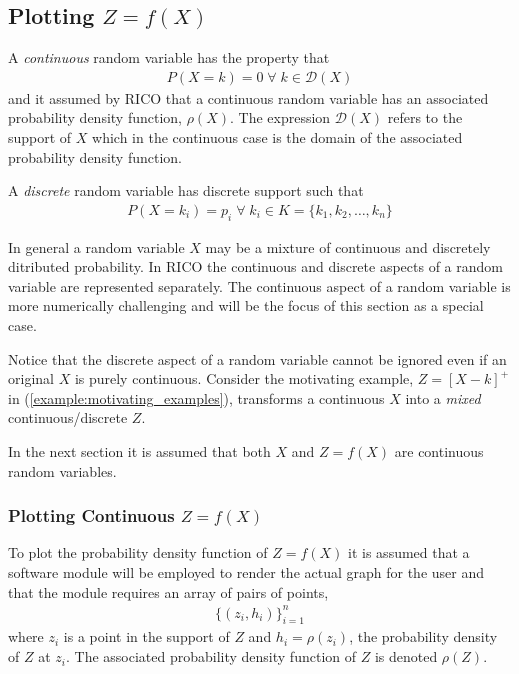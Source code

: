 \subsection{Plotting $Z = f(X)$}

A \emph{continuous} random variable has the property that
\begin{align}
P(X = k) = 0 \;\forall \;k \in \mathcal{D}(X)
\label{prop:conditional_random_variable}
\end{align}
and it assumed by RICO that a continuous random variable has an associated probability density function, $\rho(X)$. The expression $\mathcal{D}(X)$ refers to the support of $X$ which in the continuous case is the domain of the associated probability density function.

A \emph{discrete} random variable has discrete support such that
\begin{align}
P(X = k_i) = p_i \;\forall\;k_i \in K = \{k_1, k_2, \dots, k_n\}
\label{prop:discrete_random_variable}
\end{align}

In general a random variable $X$ may be a mixture of continuous and discretely ditributed probability. In RICO the continuous and discrete aspects of a random variable are represented separately. The continuous aspect of a random variable is more numerically challenging and will be the focus of this section as a special case. 

Notice that the discrete aspect of a random variable cannot be ignored even if an original $X$ is purely continuous. Consider the motivating example, $Z = [X-k]^+$ in (\ref{example:motivating_examples}), transforms a continuous $X$ into a \emph{mixed} continuous/discrete $Z$.

In the next section it is assumed that both $X$ and $Z = f(X)$ are continuous random variables.

\subsubsection{Plotting Continuous $Z = f(X)$}

To plot the probability density function of $Z = f(X)$ it is assumed that a software module will be employed to render the actual graph for the user and that the module requires an array of pairs of points, 
\begin{align}
\{(z_i, h_i)\}_{i=1}^n
\label{exp:graph_list}
\end{align}
where $z_i$ is a point in the support of $Z$ and $h_i = \rho(z_i)$, the probability density of $Z$ at $z_i$. The associated probability density function of $Z$ is denoted $\rho(Z)$. 

